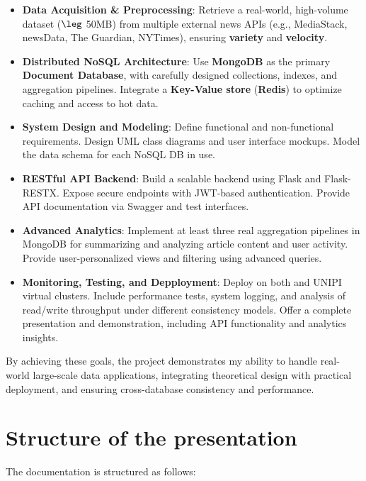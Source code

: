 \begin{itemize}
    \item \textbf{Data Acquisition \& Preprocessing}: Retrieve a real-world, high-volume dataset ($\leg$ 50MB) from multiple external news APIs (e.g., MediaStack, newsData, The Guardian, NYTimes), ensuring \textbf{variety} and \textbf{velocity}.
    \item \textbf{Distributed NoSQL Architecture}: Use \textbf{MongoDB}\cite{mongodb} as the primary \textbf{Document Database}, with carefully designed collections, indexes, and aggregation pipelines.
    Integrate a \textbf{Key-Value store} (\textbf{Redis}\cite{redis}) to optimize caching and access to hot data.
    \item \textbf{System Design and Modeling}: Define functional and non-functional requirements.
    Design UML class diagrams and user interface mockups.
    Model the data schema for each NoSQL DB in use.
    \item \textbf{RESTful API Backend}: Build a scalable backend using Flask\cite{flask} and Flask-RESTX\cite{flaskrestx}.
    Expose secure endpoints with JWT-based authentication.
    Provide API documentation via Swagger and test interfaces.
    \item \textbf{Advanced Analytics}: Implement at least three real aggregation pipelines in MongoDB for summarizing and analyzing article content and user activity.
    Provide user-personalized views and filtering using advanced queries.
    \item \textbf{Monitoring, Testing, and Depployment}: Deploy on both and UNIPI virtual clusters\cite{docker}.
    Include performance tests, system logging, and analysis of read/write throughput under different consistency models.
    Offer a complete presentation and demonstration, including API functionality and analytics insights.
\end{itemize}

By achieving these goals, the project demonstrates my ability to handle real-world large-scale data applications,
integrating theoretical design with practical deployment, and ensuring cross-database consistency and performance.


\section{Structure of the presentation}\label{sec:structure-of-the-presentation}

The documentation is structured as follows:

